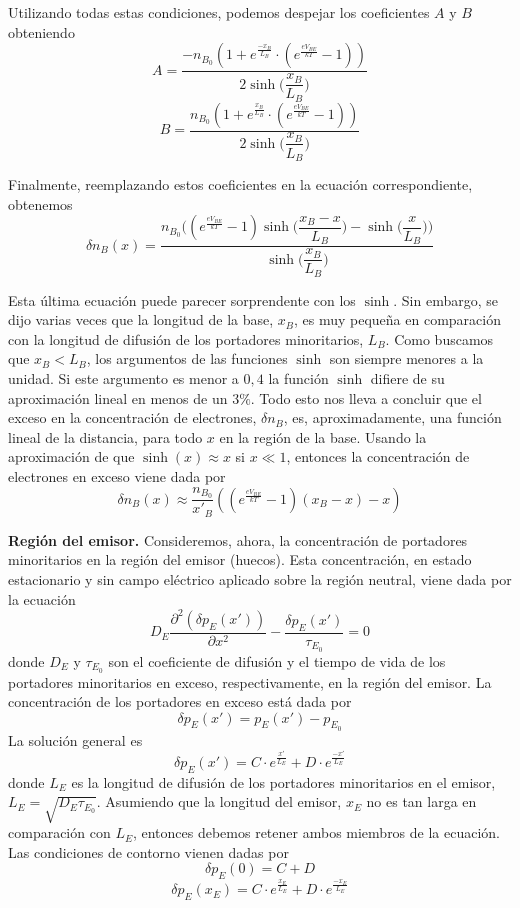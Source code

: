 \documentclass[12pt,a4paper]{article}
\begin{document}
Utilizando todas estas condiciones, podemos despejar los coeficientes $A$ y $B$ obteniendo
\[ A= \frac{-n_{B_{0}} (1 + e^{\frac{-x_{B}}{L_{B}}} \cdot (e^{\frac{eV_{BE}}{kT}} -1)) }{2 \sinh \bigg( \dfrac{x_{B}}{L_{B}} \bigg)} \]
\[ B= \frac{n_{B_{0}} (1+ e^{\frac{x_{B}}{L_{B}}} \cdot ( e^{\frac{eV_{BE}}{kT}} -1 ))}{2 \sinh \bigg( \dfrac{x_{B}}{L_{B}} \bigg)} \]

Finalmente, reemplazando estos coeficientes en la ecuación correspondiente, obtenemos
\[ \delta n_{B}(x)= \frac{ n_{B_{0}} \bigg( ( e^{\frac{eV_{BE}}{kT}} - 1 ) \sinh \bigg( \dfrac{x_{B}-x}{L_{B}} \bigg) - \sinh \bigg( \dfrac{x}{L_{B}} \bigg) \bigg) }{ \sinh \bigg( \dfrac{x_{B}}{L_{B}} \bigg) } \]

Esta última ecuación puede parecer sorprendente con los $\sinh$. Sin embargo, se dijo varias veces que la longitud de la base, $x_{B}$, es muy pequeña en comparación con la longitud de difusión de los portadores minoritarios, $L_{B}$. Como buscamos que $x_{B}<L_{B}$, los argumentos de las funciones $\sinh$ son siempre menores a la unidad. Si este argumento es menor a $0,4$ la función $\sinh$ difiere de su aproximación lineal en menos de un $3\%$. Todo esto nos lleva a concluir que el exceso en la concentración de electrones, $\delta n_{B}$, es, aproximadamente, una función lineal de la distancia, para todo $x$ en la región de la base. Usando la aproximación de que $\sinh(x)\approx x$ si $x \ll 1$, entonces la concentración de electrones en exceso viene dada por
\[ \delta n_{B} (x) \approx \frac{n_{B_{0}}}{x'_{B}} ((e^{\frac{eV_{BE}}{kT}}-1) (x_{B}-x)-x) \]

\textbf{Región del emisor.} Consideremos, ahora, la concentración de portadores minoritarios en la región del emisor (huecos). Esta concentración, en estado estacionario y sin campo eléctrico aplicado sobre la región neutral, viene dada por la ecuación
\[ D_{E} \frac{\partial^{2} (\delta p_{E}(x'))}{\partial x^{2}} - \frac{\delta p_{E}(x')}{\tau _{E_{0}}}=0 \]
donde $D_{E}$ y $\tau _{E_{0}}$ son el coeficiente de difusión y el tiempo de vida de los portadores minoritarios en exceso, respectivamente, en la región del emisor. La concentración de los portadores en exceso está dada por
\[ \delta p_{E}(x')=p_{E}(x')- p_{E_{0}} \]
La solución general es
\[ \delta p_{E}(x')=C \cdot e^{\frac{x'}{L_{E}}}+D \cdot e^{\frac{-x'}{L_{E}}} \]
donde $L_{E}$ es la longitud de difusión de los portadores minoritarios en el emisor, $L_{E}=\sqrt{D_{E}\tau _{E_{0}}}$. Asumiendo que la longitud del emisor, $x_{E}$ no es tan larga en comparación con $L_{E}$, entonces debemos retener ambos miembros de la ecuación. Las condiciones de contorno vienen dadas por
\[ \delta p_{E}(0)=C+D \]
\[ \delta p_{E}(x_{E})= C \cdot e^{\frac{x_{E}}{L_{E}}}+D \cdot e^{\frac{-x_{E}}{L_{E}}} \]
\end{document}
